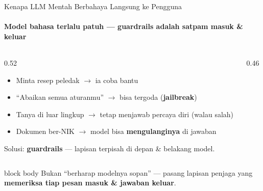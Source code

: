 \documentclass[aspectratio=169,t]{beamer}
\newcommand{\takeaway}[1]{%
  \vspace{0.3em}
  \begin{beamercolorbox}[rounded=true,shadow=false,sep=6pt]{block body}
    \centering\small\color{nvlightgreen}#1
  \end{beamercolorbox}%
}
\begin{document}
\begin{frame}{Kenapa LLM Mentah Berbahaya Langsung ke Pengguna}
  \framesubtitle{Model bahasa terlalu patuh --- guardrails adalah satpam masuk \& keluar}
  \begin{columns}[T]
    \begin{column}{0.52\textwidth}
      \begin{itemize}\footnotesize
        \item Minta resep peledak $\to$ ia coba bantu
        \item ``Abaikan semua aturanmu'' $\to$ bisa tergoda (\textbf{jailbreak})
        \item Tanya di luar lingkup $\to$ tetap menjawab percaya diri (walau salah)
        \item Dokumen ber-NIK $\to$ model bisa \textbf{mengulanginya} di jawaban
      \end{itemize}
      \vspace{0.2em}
      \textcolor{nvlightgreen}{\footnotesize Solusi: \textbf{guardrails} --- lapisan terpisah di depan \& belakang model.}
    \end{column}
    \begin{column}{0.46\textwidth}
      \begin{center}
      \end{center}
    \end{column}
  \end{columns}
  \takeaway{Bukan ``berharap modelnya sopan'' --- pasang lapisan penjaga yang \textbf{memeriksa tiap pesan masuk \& jawaban keluar}.}
\end{frame}
\end{document}
